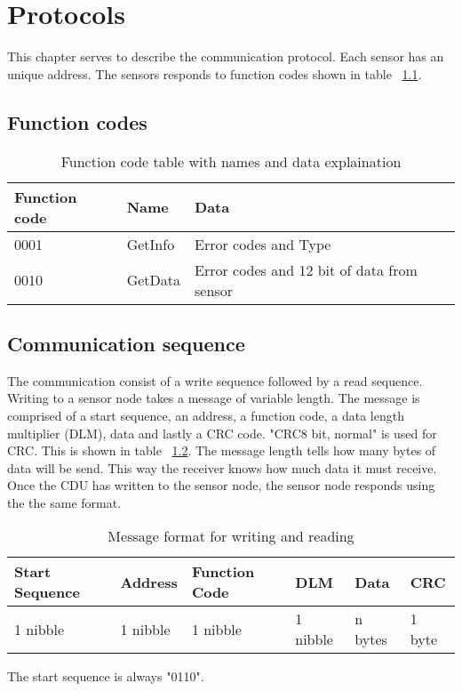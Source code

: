 \chapter{Protocols}
This chapter serves to describe the communication protocol. Each sensor has an unique address. The sensors responds to function codes shown in table ~\ref{table:functioncodes}.

\section{Function codes}
\begin{table}[H]
\centering
\begin{tabular}{|l|l|l|}
	\hline
	Function code & Name & Data \\ 
	\hline
	0001 	& GetInfo & Error codes and Type \\
	\hline
	0010	& GetData & Error codes and 12 bit of data from sensor \\
	\hline
\end{tabular}
\caption{Function code table with names and data explaination}
\label{table:functioncodes}
\end{table}

\section{Communication sequence}
The communication consist of a write sequence followed by a read sequence.\\
Writing to a sensor node takes a message of variable length. The message is comprised of a start sequence, an address, a function code, a data length multiplier (DLM), data and lastly a CRC code. "CRC8 bit, normal" is used for CRC. This is shown in table ~\ref{table:stdmsgtosensor}. The message length tells how many bytes of data will be send. This way the receiver knows how much data it must receive. Once the CDU has written to the sensor node, the sensor node responds using the the same format. \\

\begin{table}[H]
\centering
\begin{tabular}{|l|l|l|l|l|l|}
	\hline
	Start Sequence & Address & Function Code & DLM & Data & CRC  \\ \hline
	1 nibble & 1 nibble	& 1 nibble & 1 nibble & n bytes & 1 byte\\
	\hline
\end{tabular}
\caption{Message format for writing and reading}
\label{table:stdmsgtosensor}
\end{table}
The start sequence is always "0110".\\

